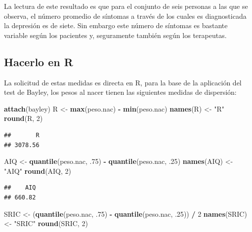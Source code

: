 \documentclass[]{book}
\newenvironment{Shaded}{\begin{snugshade}}{\end{snugshade}}
\newcommand{\DecValTok}[1]{\textcolor[rgb]{0.00,0.00,0.81}{#1}}
\newcommand{\FloatTok}[1]{\textcolor[rgb]{0.00,0.00,0.81}{#1}}
\newcommand{\KeywordTok}[1]{\textcolor[rgb]{0.13,0.29,0.53}{\textbf{#1}}}
\newcommand{\NormalTok}[1]{#1}
\newcommand{\OperatorTok}[1]{\textcolor[rgb]{0.81,0.36,0.00}{\textbf{#1}}}
\newcommand{\StringTok}[1]{\textcolor[rgb]{0.31,0.60,0.02}{#1}}
\begin{document}
La lectura de este resultado es que para el conjunto de seis personas a las que se observa, el número promedio de síntomas a través de los
cuales es diagnosticada la depresión es de siete. Sin embargo este
número de síntomas es bastante variable según los pacientes y,
seguramente también según los terapeutas.

\hypertarget{hacerlo-en-r-1}{%
\subsection{Hacerlo en R}\label{hacerlo-en-r-1}}

La solicitud de estas medidas es directa en R, para la base de la aplicación del test de Bayley, los pesos al nacer tienen las siguientes medidas de dispersión:

\begin{Shaded}
\begin{Highlighting}[]
\KeywordTok{attach}\NormalTok{(bayley)}
\NormalTok{R <-}\StringTok{ }\KeywordTok{max}\NormalTok{(peso.nac) }\OperatorTok{-}\StringTok{ }\KeywordTok{min}\NormalTok{(peso.nac)}
\KeywordTok{names}\NormalTok{(R) <-}\StringTok{ "R"}
\KeywordTok{round}\NormalTok{(R, }\DecValTok{2}\NormalTok{)}
\end{Highlighting}
\end{Shaded}

\begin{verbatim}
##       R 
## 3078.56
\end{verbatim}

\begin{Shaded}
\begin{Highlighting}[]
\NormalTok{AIQ <-}\StringTok{ }\KeywordTok{quantile}\NormalTok{(peso.nac, }\FloatTok{.75}\NormalTok{) }\OperatorTok{-}\StringTok{ }\KeywordTok{quantile}\NormalTok{(peso.nac, }\FloatTok{.25}\NormalTok{)}
\KeywordTok{names}\NormalTok{(AIQ) <-}\StringTok{ "AIQ"}
\KeywordTok{round}\NormalTok{(AIQ, }\DecValTok{2}\NormalTok{)}
\end{Highlighting}
\end{Shaded}

\begin{verbatim}
##    AIQ 
## 660.82
\end{verbatim}

\begin{Shaded}
\begin{Highlighting}[]
\NormalTok{SRIC <-}\StringTok{ }\NormalTok{(}\KeywordTok{quantile}\NormalTok{(peso.nac, }\FloatTok{.75}\NormalTok{) }\OperatorTok{-}\StringTok{ }\KeywordTok{quantile}\NormalTok{(peso.nac, }\FloatTok{.25}\NormalTok{)) }\OperatorTok{/}\StringTok{ }\DecValTok{2}
\KeywordTok{names}\NormalTok{(SRIC) <-}\StringTok{ "SRIC"}
\KeywordTok{round}\NormalTok{(SRIC, }\DecValTok{2}\NormalTok{)}
\end{Highlighting}
\end{Shaded}
\end{document}
